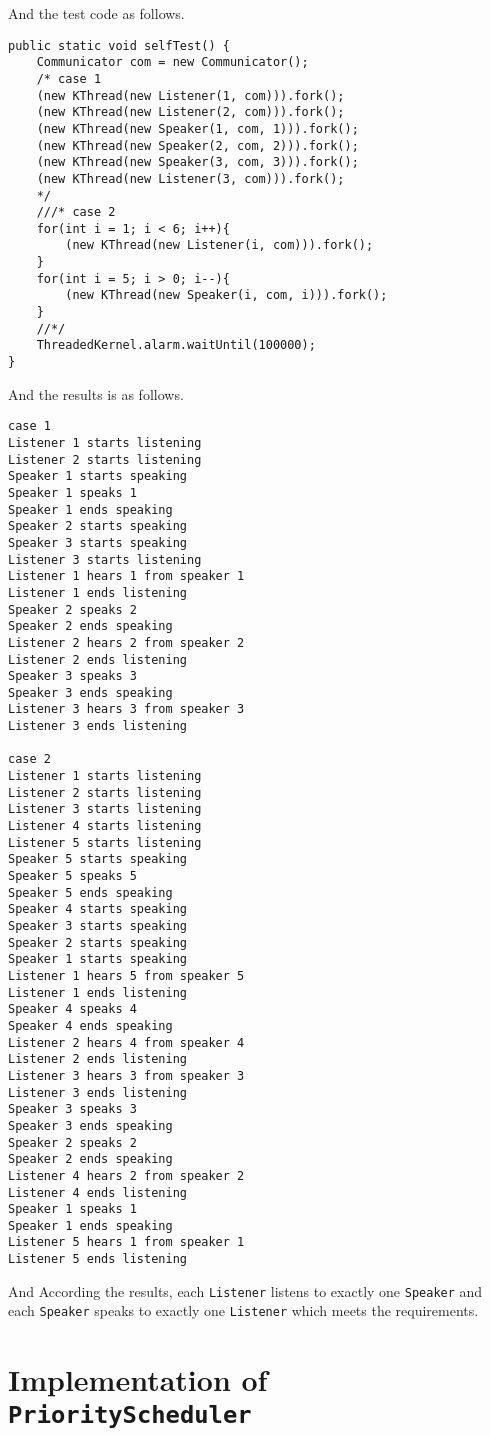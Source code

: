 \documentclass{article}
\begin{document}
And the test code as follows.
\begin{lstlisting}
public static void selfTest() {
	Communicator com = new Communicator();
	/* case 1 
	(new KThread(new Listener(1, com))).fork();
	(new KThread(new Listener(2, com))).fork();
	(new KThread(new Speaker(1, com, 1))).fork();
	(new KThread(new Speaker(2, com, 2))).fork();
	(new KThread(new Speaker(3, com, 3))).fork();
	(new KThread(new Listener(3, com))).fork();
	*/
	///* case 2
	for(int i = 1; i < 6; i++){
		(new KThread(new Listener(i, com))).fork();
	}
	for(int i = 5; i > 0; i--){
		(new KThread(new Speaker(i, com, i))).fork();	
	}
	//*/
	ThreadedKernel.alarm.waitUntil(100000);
}
\end{lstlisting}

And the results is as follows.
\begin{lstlisting}
case 1
Listener 1 starts listening
Listener 2 starts listening
Speaker 1 starts speaking
Speaker 1 speaks 1
Speaker 1 ends speaking
Speaker 2 starts speaking
Speaker 3 starts speaking
Listener 3 starts listening
Listener 1 hears 1 from speaker 1
Listener 1 ends listening
Speaker 2 speaks 2
Speaker 2 ends speaking
Listener 2 hears 2 from speaker 2
Listener 2 ends listening
Speaker 3 speaks 3
Speaker 3 ends speaking
Listener 3 hears 3 from speaker 3
Listener 3 ends listening

case 2
Listener 1 starts listening
Listener 2 starts listening
Listener 3 starts listening
Listener 4 starts listening
Listener 5 starts listening
Speaker 5 starts speaking
Speaker 5 speaks 5
Speaker 5 ends speaking
Speaker 4 starts speaking
Speaker 3 starts speaking
Speaker 2 starts speaking
Speaker 1 starts speaking
Listener 1 hears 5 from speaker 5
Listener 1 ends listening
Speaker 4 speaks 4
Speaker 4 ends speaking
Listener 2 hears 4 from speaker 4
Listener 2 ends listening
Listener 3 hears 3 from speaker 3
Listener 3 ends listening
Speaker 3 speaks 3
Speaker 3 ends speaking
Speaker 2 speaks 2
Speaker 2 ends speaking
Listener 4 hears 2 from speaker 2
Listener 4 ends listening
Speaker 1 speaks 1
Speaker 1 ends speaking
Listener 5 hears 1 from speaker 1
Listener 5 ends listening
\end{lstlisting}

And According the results, each \texttt{Listener} listens to exactly one \texttt{Speaker} and each \texttt{Speaker} speaks to exactly one \texttt{Listener} which meets the requirements.
\section{Implementation of \texttt{PriorityScheduler}}
\end{document}
